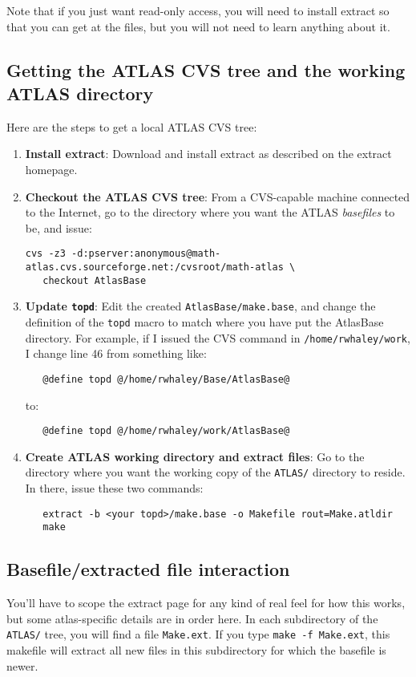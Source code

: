\documentclass[11pt]{article}
\begin{document}
Note that if you just want read-only access, you will
need to install extract so that you can get at the files, but you will
not need to learn anything about it.

\subsection{Getting the ATLAS CVS tree and the working ATLAS directory}
Here are the steps to get a local ATLAS CVS tree:
\begin{enumerate}
   \item {\bf Install extract}:
Download and install extract as described on the extract homepage.

\item {\bf Checkout the ATLAS CVS tree}:
From a CVS-capable machine connected to the Internet, go to the directory
where you want the ATLAS {\em basefiles} to be, and issue:
\begin{verbatim}
cvs -z3 -d:pserver:anonymous@math-atlas.cvs.sourceforge.net:/cvsroot/math-atlas \
   checkout AtlasBase
\end{verbatim}

\item {\bf Update {\tt topd}}:
Edit the created {\tt AtlasBase/make.base}, and change the definition of
the {\tt topd} macro to match where you have put the AtlasBase directory.
For example, if I issued the CVS command in {\tt /home/rwhaley/work},
I change line 46 from something like:
\begin{verbatim}
   @define topd @/home/rwhaley/Base/AtlasBase@
\end{verbatim}
to:
\begin{verbatim}
   @define topd @/home/rwhaley/work/AtlasBase@
\end{verbatim}

\item {\bf Create ATLAS working directory and extract files}:
Go to the directory where you want the working copy of the {\tt ATLAS/}
directory to reside. In there, issue these two commands:
\begin{verbatim}
   extract -b <your topd>/make.base -o Makefile rout=Make.atldir
   make
\end{verbatim}
\end{enumerate}

\subsection{Basefile/extracted file interaction}
You'll have to scope the extract page for any kind of real feel for how
this works, but some atlas-specific details are in order here.
In each subdirectory of the {\tt ATLAS/} tree, you will find
a file {\tt Make.ext}.  If you type {\tt make -f Make.ext}, this
makefile will extract all new files in this subdirectory for which the
basefile is newer.
\end{document}
